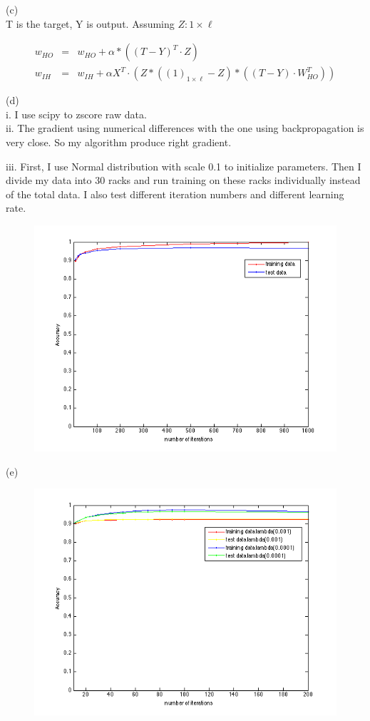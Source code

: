 \documentclass{article} %
\begin{document}
(c) \\
T is the target, Y is output. Assuming $Z : 1 \times \ell$

\begin{equation}
    \begin{array}{rcl}
      	 w_{HO} & = & w_{HO} + \alpha * ( (T - Y)^T \cdot Z) \\
	 w_{IH} & = & w_{IH} + \alpha X^T  \cdot (  Z * ( (1)_{1 \times \ell} - Z)   * (   (T - Y) \cdot W_{HO}^T )     )
    \end{array}
\end{equation}

(d) \\ i.
I use scipy to zscore raw data. \\

ii. The gradient using numerical differences with the one using backpropagation is very close. So my algorithm produce right gradient.

iii. First, I use Normal distribution with scale 0.1 to initialize parameters. Then I divide my data into 30 racks and run training on these racks individually instead of the total data. I also test different iteration numbers and different learning rate.

\begin{figure}[htbp] %
   \centering
   \includegraphics[width=5in]{img/p4.png} 
\end{figure}

\pagebreak

(e) \\
\begin{figure}[htbp] %
   \centering
   \includegraphics[width=5in]{img/p5.png} 
\end{figure}
\end{document}
